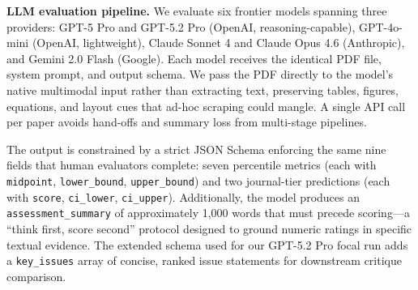 \documentclass[
  11pt,
  letterpaper,
]{article}
\begin{document}
\textbf{LLM evaluation pipeline.} We evaluate six frontier models
spanning three providers: GPT-5 Pro and GPT-5.2 Pro (OpenAI,
reasoning-capable), GPT-4o-mini (OpenAI, lightweight), Claude Sonnet 4
and Claude Opus 4.6 (Anthropic), and Gemini 2.0 Flash (Google). Each
model receives the identical PDF file, system prompt, and output schema.
We pass the PDF directly to the model's native multimodal input rather
than extracting text, preserving tables, figures, equations, and layout
cues that ad-hoc scraping could mangle. A single API call per paper
avoids hand-offs and summary loss from multi-stage pipelines.

The output is constrained by a strict JSON Schema enforcing the same
nine fields that human evaluators complete: seven percentile metrics
(each with \texttt{midpoint}, \texttt{lower\_bound},
\texttt{upper\_bound}) and two journal-tier predictions (each with
\texttt{score}, \texttt{ci\_lower}, \texttt{ci\_upper}). Additionally,
the model produces an \texttt{assessment\_summary} of approximately
1,000 words that must precede scoring---a ``think first, score second''
protocol designed to ground numeric ratings in specific textual
evidence. The extended schema used for our GPT-5.2 Pro focal run adds a
\texttt{key\_issues} array of concise, ranked issue statements for
downstream critique comparison.
\end{document}
